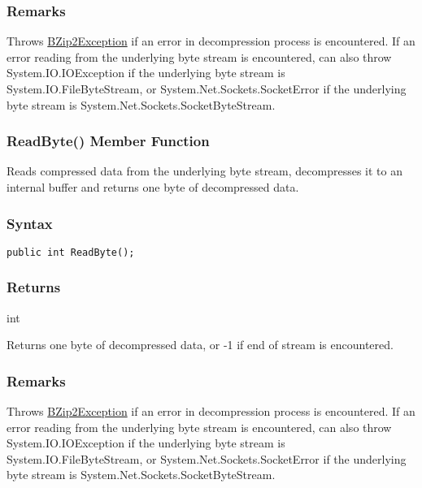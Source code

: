 \documentclass[a4paper,oneside,11.000000pt]{book}
\begin{document}
\subsubsection*{Remarks}
\begin{flushleft}
Throws \hyperlink{System.IO.Compression.BZip2Exception}{BZip2Exception} if an error in decompression process is encountered.
If an error reading from the underlying byte stream is encountered, 
can also throw System.\-IO.\-IOException if the underlying byte stream is System.\-IO.\-FileByteStream, or
System.\-Net.\-Sockets.\-SocketError if the underlying byte stream is System.\-Net.\-Sockets.\-SocketByteStream.

\end{flushleft}
\clearpage

\hypertarget{System.IO.Compression.BZip2Stream.ReadByte.P.System.IO.Compression.BZip2Stream}{\subsubsection*{ReadByte() Member Function}}
\begin{flushleft}
Reads compressed data from the underlying byte stream, decompresses it to an internal buffer 
and returns one byte of decompressed data.

\end{flushleft}
\subsubsection*{Syntax}\texttt{public int ReadByte();}
\subsubsection*{Returns}
int
\begin{flushleft}
Returns one byte of decompressed data, or -1 if end of stream is encountered.

\end{flushleft}
\subsubsection*{Remarks}
\begin{flushleft}
Throws \hyperlink{System.IO.Compression.BZip2Exception}{BZip2Exception} if an error in decompression process is encountered.
If an error reading from the underlying byte stream is encountered, 
can also throw System.\-IO.\-IOException if the underlying byte stream is System.\-IO.\-FileByteStream, or
System.\-Net.\-Sockets.\-SocketError if the underlying byte stream is System.\-Net.\-Sockets.\-SocketByteStream.

\end{flushleft}
\clearpage
\end{document}
